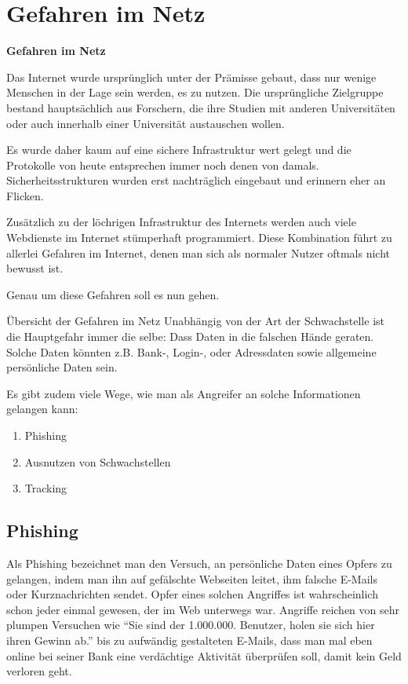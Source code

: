 \documentclass[utf8]{beamer}
\begin{document}
	\section{Gefahren im Netz}
	\begin{frame}
		\centering \huge \textbf{Gefahren im Netz}
	\end{frame}
	
	\begin{frame}
		Das Internet wurde ursprünglich unter der Prämisse gebaut, dass nur wenige Menschen in der Lage sein werden, es zu nutzen. Die ursprüngliche Zielgruppe bestand hauptsächlich aus Forschern, die ihre Studien mit anderen Universitäten oder auch innerhalb einer Universität austauschen wollen.
		
		Es wurde daher kaum auf eine sichere Infrastruktur wert gelegt und die Protokolle von heute entsprechen immer noch denen von damals. Sicherheitsstrukturen wurden erst nachträglich eingebaut und erinnern eher an Flicken.
	\end{frame}

	\begin{frame}
		Zusätzlich zu der löchrigen Infrastruktur des Internets werden auch viele Webdienste im Internet stümperhaft programmiert. Diese Kombination führt zu allerlei Gefahren im Internet, denen man sich als normaler Nutzer oftmals nicht bewusst ist.
		
		Genau um diese Gefahren soll es nun gehen.
	\end{frame}

	\begin{frame}{Übersicht der Gefahren im Netz}
		Unabhängig von der Art der Schwachstelle ist die Hauptgefahr immer die selbe: Dass Daten in die falschen Hände geraten. Solche Daten könnten z.B. Bank-, Login-, oder Adressdaten sowie allgemeine persönliche Daten sein. 
		
		Es gibt zudem viele Wege, wie man als Angreifer an solche Informationen gelangen kann:
		\begin{enumerate}
			\item Phishing
			\item Ausnutzen von Schwachstellen
			\item Tracking			
		\end{enumerate}
	\end{frame}

	\subsection{Phishing}
	\begin{frame}
		Als Phishing bezeichnet man den Versuch, an persönliche Daten eines Opfers zu gelangen, indem man ihn auf gefälschte Webseiten leitet, ihm falsche E-Mails oder Kurznachrichten sendet.
		Opfer eines solchen Angriffes ist wahrscheinlich schon jeder einmal gewesen, der im Web unterwegs war. Angriffe reichen von sehr plumpen Versuchen wie \enquote{Sie sind der 1.000.000. Benutzer, holen sie sich hier ihren Gewinn ab.} bis zu aufwändig gestalteten E-Mails, dass man mal eben online bei seiner Bank eine verdächtige Aktivität überprüfen soll, damit kein Geld verloren geht.
	\end{frame}
\end{document}
